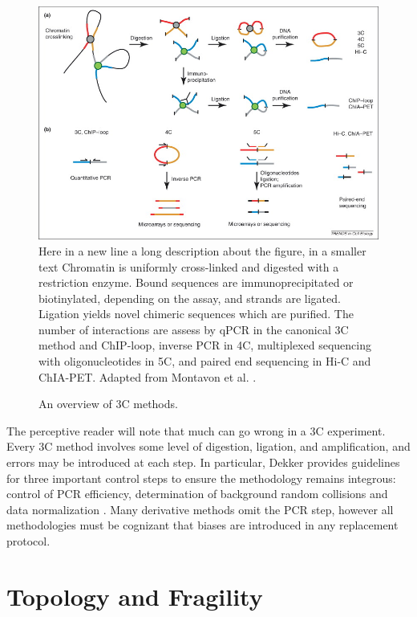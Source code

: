 \begin{figure}[h]
  \centering
  \caption{An overview of \gls{3C} methods.}\label{fig:captureTechniques}
  \includegraphics[width=\textwidth]{figures/biology/CompareChromosomeCapture}
  \medskip
  \small
  Here in a new line a long description about the figure, in a smaller text
  Chromatin is uniformly cross-linked and digested with a restriction enzyme.
  Bound sequences are immunoprecipitated or biotinylated, depending on the
  assay, and strands are ligated.  Ligation yields novel chimeric sequences
  which are purified.  The number of interactions are assess by qPCR in
  the canonical \gls{3C} method and ChIP-loop, inverse PCR in 4C, multiplexed
  sequencing with oligonucleotides in 5C, and paired end sequencing in Hi-C
  and ChIA-PET\@.  Adapted from Montavon et al. \citep{montavon2012}.
\end{figure}


The perceptive reader will note that much can go wrong in a \gls{3C} experiment. Every \gls{3C} method involves some level of digestion, ligation,
and amplification, and errors may be introduced at each step.  In particular, Dekker provides guidelines for three important control steps to
ensure the methodology remains integrous: control of PCR efficiency, determination of background random collisions and data
normalization \citep{dekker2006}.  Many derivative methods omit the PCR step, however all methodologies must be cognizant that
biases are introduced in any replacement protocol.

\section*{Topology and Fragility}

